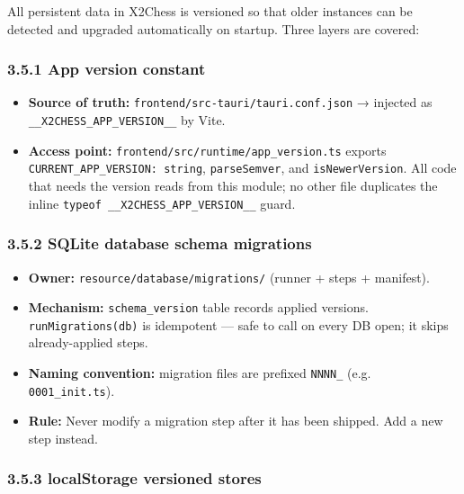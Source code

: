 \documentclass[]{article}
\providecommand{\tightlist}{%
  \setlength{\itemsep}{0pt}\setlength{\parskip}{0pt}}
\begin{document}
All persistent data in X2Chess is versioned so that older instances can
be detected and upgraded automatically on startup. Three layers are
covered:

\subsubsection{3.5.1 App version constant}\label{app-version-constant}

\begin{itemize}
\tightlist
\item
  \textbf{Source of truth:} \texttt{frontend/src-tauri/tauri.conf.json}
  → injected as \texttt{\_\_X2CHESS\_APP\_VERSION\_\_} by Vite.
\item
  \textbf{Access point:} \texttt{frontend/src/runtime/app\_version.ts}
  exports \texttt{CURRENT\_APP\_VERSION:\ string}, \texttt{parseSemver},
  and \texttt{isNewerVersion}. All code that needs the version reads
  from this module; no other file duplicates the inline
  \texttt{typeof\ \_\_X2CHESS\_APP\_VERSION\_\_} guard.
\end{itemize}

\subsubsection{3.5.2 SQLite database schema
migrations}\label{sqlite-database-schema-migrations}

\begin{itemize}
\tightlist
\item
  \textbf{Owner:} \texttt{resource/database/migrations/} (runner + steps
  + manifest).
\item
  \textbf{Mechanism:} \texttt{schema\_version} table records applied
  versions. \texttt{runMigrations(db)} is idempotent --- safe to call on
  every DB open; it skips already-applied steps.
\item
  \textbf{Naming convention:} migration files are prefixed
  \texttt{NNNN\_} (e.g. \texttt{0001\_init.ts}).
\item
  \textbf{Rule:} Never modify a migration step after it has been
  shipped. Add a new step instead.
\end{itemize}

\subsubsection{3.5.3 localStorage versioned
stores}\label{localstorage-versioned-stores}
\end{document}
